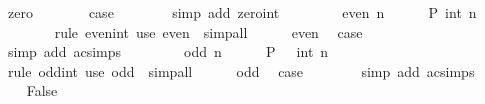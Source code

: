 \begin{isabellebody}
\ zero\isanewline
\ \ \ \ \isamarkupfalse%
\ \isamarkupfalse%
\ {\isacharquery}{\kern0pt}case\isanewline
\ \ \ \ \ \ \isamarkupfalse%
\ {\isacharparenleft}{\kern0pt}simp\ add{\isacharcolon}{\kern0pt}\ zero{\isacharunderscore}{\kern0pt}int{\isacharparenright}{\kern0pt}\isanewline
\ \ \isamarkupfalse%
\isanewline
\ \ \ \ \isamarkupfalse%
\ {\isacharparenleft}{\kern0pt}even\ n{\isacharparenright}{\kern0pt}\isanewline
\ \ \ \ \isamarkupfalse%
\ {\isachardoublequoteopen}P\ {\isacharparenleft}{\kern0pt}int\ n\ {\isacharasterisk}{\kern0pt}\ {}{\isacharparenright}{\kern0pt}{\isachardoublequoteclose}\isanewline
\ \ \ \ \ \ \isamarkupfalse%
\ {\isacharparenleft}{\kern0pt}rule\ even{\isacharunderscore}{\kern0pt}int{\isacharparenright}{\kern0pt}\ {\isacharparenleft}{\kern0pt}use\ even\ \ simp{\isacharunderscore}{\kern0pt}all{\isacharparenright}{\kern0pt}\isanewline
\ \ \ \ \isamarkupfalse%
\ even\ \isamarkupfalse%
\ {\isacharquery}{\kern0pt}case\isanewline
\ \ \ \ \ \ \isamarkupfalse%
\ {\isacharparenleft}{\kern0pt}simp\ add{\isacharcolon}{\kern0pt}\ ac{\isacharunderscore}{\kern0pt}simps{\isacharparenright}{\kern0pt}\isanewline
\ \ \isamarkupfalse%
\isanewline
\ \ \ \ \isamarkupfalse%
\ {\isacharparenleft}{\kern0pt}odd\ n{\isacharparenright}{\kern0pt}\isanewline
\ \ \ \ \isamarkupfalse%
\ {\isachardoublequoteopen}P\ {\isacharparenleft}{\kern0pt}{}\ {\isacharplus}{\kern0pt}\ {\isacharparenleft}{\kern0pt}int\ n\ {\isacharasterisk}{\kern0pt}\ {}{\isacharparenright}{\kern0pt}{\isacharparenright}{\kern0pt}{\isachardoublequoteclose}\isanewline
\ \ \ \ \ \ \isamarkupfalse%
\ {\isacharparenleft}{\kern0pt}rule\ odd{\isacharunderscore}{\kern0pt}int{\isacharparenright}{\kern0pt}\ {\isacharparenleft}{\kern0pt}use\ odd\ \ simp{\isacharunderscore}{\kern0pt}all{\isacharparenright}{\kern0pt}\isanewline
\ \ \ \ \isamarkupfalse%
\ odd\ \isamarkupfalse%
\ {\isacharquery}{\kern0pt}case\isanewline
\ \ \ \ \ \ \isamarkupfalse%
\ {\isacharparenleft}{\kern0pt}simp\ add{\isacharcolon}{\kern0pt}\ ac{\isacharunderscore}{\kern0pt}simps{\isacharparenright}{\kern0pt}\isanewline
\ \ \isamarkupfalse%
\isanewline
{}\isamarkupfalse%
\isanewline
\ \ \isamarkupfalse%
\ False\isanewline
\ \ \isamarkupfalse%

\end{isabellebody}

